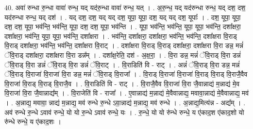 \documentclass[17pt]{extarticle}
\begin{document}
40. अवा॑ रुन्धा रु॒न्धा वावा॑ रुन्ध॒ यद् यद॑रु॒न्धा वावा॑ रुन्ध॒ यत् । . अ॒रु॒न्ध॒ यद् यद॑रुन्धा रुन्ध॒ यद् दश॒ दश॒ यद॑रुन्धा रुन्ध॒ यद् दश॑ । . यद् दश॒ दश॒ यद् यद् दश॒ यूपा॒ यूपा॒ दश॒ यद् यद् दश॒ यूपाः᳚ । . दश॒ यूपा॒ यूपा॒ दश॒ दश॒ यूपा॒ भव॑न्ति॒ भव॑न्ति॒ यूपा॒ दश॒ दश॒ यूपा॒ भव॑न्ति । . यूपा॒ भव॑न्ति॒ भव॑न्ति॒ यूपा॒ यूपा॒ भव॑न्ति॒ दशा᳚क्षरा॒ दशा᳚क्षरा॒ भव॑न्ति॒ यूपा॒ यूपा॒ भव॑न्ति॒ दशा᳚क्षरा । . भव॑न्ति॒ दशा᳚क्षरा॒ दशा᳚क्षरा॒ भव॑न्ति॒ भव॑न्ति॒ दशा᳚क्षरा वि॒राड् वि॒राड् दशा᳚क्षरा॒ भव॑न्ति॒ भव॑न्ति॒ दशा᳚क्षरा वि॒राट् । . दशा᳚क्षरा वि॒राड् वि॒राड् दशा᳚क्षरा॒ दशा᳚क्षरा वि॒रा डन्न॒ मन्नं॑ ॅवि॒राड् दशा᳚क्षरा॒ दशा᳚क्षरा वि॒रा डन्न᳚म् । . दशा᳚क्ष॒रेति॒ दश॑ - अ॒क्ष॒रा॒ । . वि॒रा डन्न॒ मन्नं॑ ॅवि॒राड् वि॒रा डन्नं॑ ॅवि॒राड् वि॒रा डन्नं॑ ॅवि॒राड् वि॒रा डन्नं॑ ॅवि॒राट् । . वि॒राडिति॑ वि - राट् । . अन्नं॑ ॅवि॒राड् वि॒रा डन्न॒ मन्नं॑ ॅवि॒राड् वि॒राजा॑ वि॒राजा॑ वि॒रा डन्न॒ मन्नं॑ ॅवि॒राड् वि॒राजा᳚ । . वि॒राड् वि॒राजा॑ वि॒राजा॑ वि॒राड् वि॒राड् वि॒राजै॒वैव वि॒राजा॑ वि॒राड् वि॒राड् वि॒राजै॒व । . वि॒राडिति॑ वि - राट् । . वि॒राजै॒वैव वि॒राजा॑ वि॒रा जै॒वान्नाद्य॑ म॒न्नाद्य॑ मे॒व वि॒राजा॑ वि॒रा जै॒वान्नाद्य᳚म् । . वि॒राजेति॑ वि - राजा᳚ । . ए॒वान्नाद्य॑ म॒न्नाद्य॑ मे॒वैवान्नाद्य॒ मवावा॒न्नाद्य॑ मे॒वैवान्नाद्य॒ मव॑ । . अ॒न्नाद्य॒ मवावा॒ न्नाद्य॑ म॒न्नाद्य॒ मव॑ रुन्धे रु॒न्धे ऽवा॒न्नाद्य॑ म॒न्नाद्य॒ मव॑ रुन्धे । . अ॒न्नाद्य॒मित्य॑न्न - अद्य᳚म् । . अव॑ रुन्धे रु॒न्धे ऽवाव॑ रुन्धे॒ यो यो रु॒न्धे ऽवाव॑ रुन्धे॒ यः । . रु॒न्धे॒ यो यो रु॑न्धे रुन्धे॒ य ए॑काद॒श ए॑काद॒शो यो रु॑न्धे रुन्धे॒ य ए॑काद॒शः । \newline
\pagebreak
{}
\end{document}
